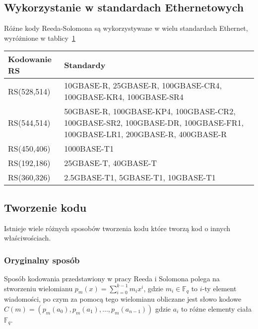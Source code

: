 \subsection{Wykorzystanie w standardach Ethernetowych}

Różne kody Reeda-Solomona są wykorzystywane w wielu standardach Ethernet,
wyróżnione w tablicy~\ref{standards:title}

\begingroup
{}
\begin{table}[h]
\label{standards:title}
\centering
    \begin{tabular}{m{3cm} m{9cm}}
    \toprule
    Kodowanie RS    & Standardy                                                         \\
    \midrule
    RS(528,514)     & 10GBASE-R, 25GBASE-R, 100GBASE-CR4, 100GBASE-KR4, 100GBASE-SR4    \\
    \midrule
    RS(544,514)     & 50GBASE-R, 100GBASE-KP4, 100GBASE-CR2, 100GBASE-SR2, 100GBASE-DR, 100GBASE-FR1, 100GBASE-LR1, 200GBASE-R, 400GBASE-R \\
    \midrule
    RS(450,406)     & 1000BASE-T1                                                       \\
    \midrule
    RS(192,186)     & 25GBASE-T, 40GBASE-T                                              \\
    \midrule
    RS(360,326)     & 2.5GBASE-T1, 5GBASE-T1, 10GBASE-T1                                \\
    \bottomrule
    \end{tabular}
\end{table}
\endgroup

\subsection{Tworzenie kodu}
Istnieje wiele różnych sposobów tworzenia kodu które tworzą kod o innych właściwościach.


\subsubsection{Oryginalny sposób}
Sposób kodowania przedstawiony w pracy Reeda i Solomona polega na stworzeniu wielomianu $p_m(x)=\sum_{i=0}^{k-1}m_{i}x^i$, gdzie $m_i\in\mathbb{F}_q$ to $i$\nobreakdash-ty element wiadomości, po czym za pomocą tego wielomianu obliczane jest słowo kodowe $C(m)=(p_m(a_0), p_m(a_1), \ldots, p_m(a_{n-1}))$ gdzie $a_i$ to różne elementy ciała $\mathbb{F}_q$.

